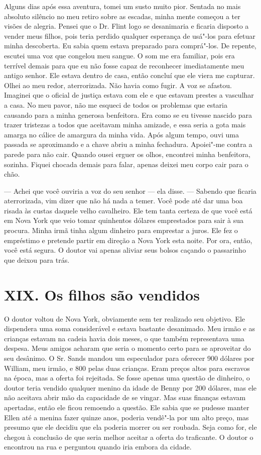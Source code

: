 Alguns dias após essa aventura, tomei
um susto muito pior. Sentada no mais absoluto silêncio no meu retiro
sobre as escadas, minha mente começou a ter visões de alegria. Pensei
que o Dr. Flint logo se desanimaria e ficaria disposto a vender meus
filhos, pois teria perdido qualquer esperança de usá"-los para efetuar
minha descoberta. Eu sabia quem estava preparado para comprá"-los. De
repente, escutei uma voz que congelou meu sangue. O som me era familiar,
pois era terrível demais para que eu não fosse capaz de reconhecer
imediatamente meu antigo senhor. Ele estava dentro de casa, então
concluí que ele viera me capturar. Olhei ao meu redor, aterrorizada. Não
havia como fugir. A voz se afastou. Imaginei que o oficial de justiça
estava com ele e que estavam prestes a vasculhar a casa. No meu pavor,
não me esqueci de todos os problemas que estaria causando para a minha
generosa benfeitora. Era como se eu tivesse nascido para trazer
tristezas a todos que aceitavam minha amizade, e essa seria a gota mais
amarga no cálice de amargura da minha vida. Após algum tempo, ouvi uma
passada se aproximando e a chave abriu a minha fechadura. Apoiei"-me
contra a parede para não cair. Quando ousei erguer os olhos, encontrei
minha benfeitora, sozinha. Fiquei chocada demais para falar, apenas
deixei meu corpo cair para o chão.

--- Achei que você ouviria a voz do seu
senhor --- ela disse. --- Sabendo que ficaria aterrorizada, vim dizer
que não há nada a temer. Você pode até dar uma boa risada às custas
daquele velho cavalheiro. Ele tem tanta certeza de que você está em Nova
York que veio tomar quinhentos dólares emprestados para sair à sua
procura. Minha irmã tinha algum dinheiro para emprestar a juros. Ele fez
o empréstimo e pretende partir em direção a Nova York esta noite. Por
ora, então, você está segura. O doutor vai apenas aliviar seus bolsos
caçando o passarinho que deixou para trás.

\chapter{XIX. Os filhos são
vendidos}

O doutor voltou de Nova York,
obviamente sem ter realizado seu objetivo. Ele dispendera uma soma
considerável e estava bastante desanimado. Meu irmão e as crianças
estavam na cadeia havia dois meses, o que também representava uma
despesa. Meus amigos acharam que seria o momento certo para se
aproveitar do seu desânimo. O Sr. Sands mandou um especulador para
oferecer 900 dólares por William, meu irmão, e 800 pelas duas crianças.
Eram preços altos para escravos na época, mas a oferta foi rejeitada. Se
fosse apenas uma questão de dinheiro, o doutor teria vendido qualquer
menino da idade de Benny por 200 dólares, mas ele não aceitava abrir mão
da capacidade de se vingar. Mas suas finanças estavam apertadas, então
ele ficou remoendo a questão. Ele sabia que se pudesse manter Ellen até
a menina fazer quinze anos, poderia vendê"-la por um alto preço, mas
presumo que ele decidiu que ela poderia morrer ou ser roubada. Seja como
for, ele chegou à conclusão de que seria melhor aceitar a oferta do
traficante. O doutor o encontrou na rua e perguntou quando iria embora
da cidade.

